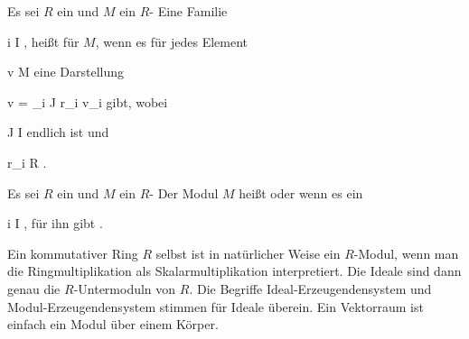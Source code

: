 {}
{




Es sei $R$ ein
und $M$ ein
$R$-
Eine Familie

 {}
 {i \in I} {}
 {} {} {} {,}
heißt  für $M$, wenn es für jedes Element

\mavergleichskette
{\vergleichskette
{ v
}
{ \in }{ M
}
{  }{
}
{    }{
}
{   }{
}
}
{}{}{}
eine Darstellung

\mavergleichskettedisp
{\vergleichskette
{v
}
{ =} {  \sum_{i \in J} r_i v_i
}
{ } {
}
{ } {
}
{ } {
}
}
{}{}{}
gibt, wobei

\mavergleichskette
{\vergleichskette
{ J
}
{ \subseteq }{ I
}
{  }{
}
{    }{
}
{   }{
}
}
{}{}{}
endlich ist und

\mavergleichskette
{\vergleichskette
{ r_i
}
{ \in }{ R
}
{  }{
}
{    }{
}
{   }{
}
}
{}{}{.}




}



{}
{




Es sei $R$ ein
und $M$ ein
$R$-
Der Modul $M$ heißt  oder  wenn es ein

 {}
 {i \in I} {}
 {} {} {} {,}
für ihn gibt
 {} {.}




}


Ein kommutativer Ring $R$ selbst ist in natürlicher Weise ein $R$-Modul, wenn man die Ringmultiplikation als Skalarmultiplikation interpretiert. Die Ideale sind dann genau die $R$-Untermoduln von $R$. Die Begriffe Ideal-Erzeugenden\-system und Modul-Erzeugendensystem stimmen für Ideale überein. Ein Vektorraum ist einfach ein Modul über einem Körper.
